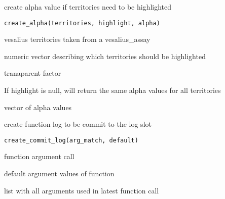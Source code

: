 \documentclass[a4paper]{book}
\begin{document}
%
\begin{Description}
create alpha value if territories need to be highlighted
\end{Description}
%
\begin{Usage}
\begin{verbatim}
create_alpha(territories, highlight, alpha)
\end{verbatim}
\end{Usage}
%
\begin{Arguments}
\begin{ldescription}
\item[\code{territories}] vesalius territories taken from a vesalius\_assay

\item[\code{highlight}] numeric vector describing which territories should 
be highlighted

\item[\code{alpha}] tranaparent factor
\end{ldescription}
\end{Arguments}
%
\begin{Details}
If highlight is null, will return the same alpha values 
for all territories
\end{Details}
%
\begin{Value}
vector of alpha values
\end{Value}
%
\begin{Description}
create function log to be commit to the log slot
\end{Description}
%
\begin{Usage}
\begin{verbatim}
create_commit_log(arg_match, default)
\end{verbatim}
\end{Usage}
%
\begin{Arguments}
\begin{ldescription}
\item[\code{arg\_match}] function argument call

\item[\code{default}] default argument values of function
\end{ldescription}
\end{Arguments}
%
\begin{Value}
list with all arguments used in latest function call
\end{Value}
\end{document}
